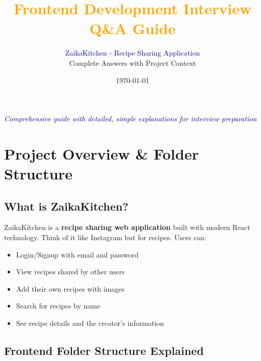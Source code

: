 \documentclass[12pt]{article}
\title{\textcolor{orange}{\textbf{Frontend Development Interview Q\&A Guide}}}
\author{\textcolor{darkblue}{ZaikaKitchen - Recipe Sharing Application} \\ Complete Answers with Project Context}
\date{\today}
\begin{document}
\maketitle

\begin{center}
\textcolor{darkblue}{\textit{Comprehensive guide with detailed, simple explanations for interview preparation}}
\end{center}

\tableofcontents
\newpage

\section{Project Overview \& Folder Structure}

\subsection{What is ZaikaKitchen?}

ZaikaKitchen is a \textbf{recipe sharing web application} built with modern React technology. Think of it like Instagram but for recipes. Users can:
\begin{itemize}
    \item Login/Signup with email and password
    \item View recipes shared by other users
    \item Add their own recipes with images
    \item Search for recipes by name
    \item See recipe details and the creator's information
\end{itemize}

\subsection{Frontend Folder Structure Explained}
\end{document}

